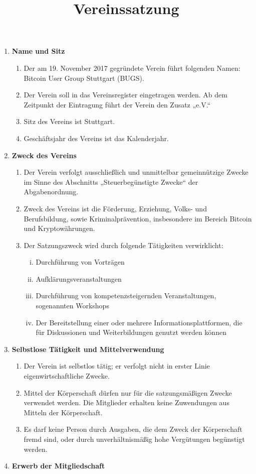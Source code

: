 \documentclass[a4paper,11pt]{article}
\title{\textsf{\textbf{Vereinssatzung}}}
\author{}
\date{}
\begin{document}
\maketitle

\begin{enumerate}[§ 1.]
\item \textsf{\textbf{Name und Sitz}}

\begin{enumerate}[1.]
\item Der am 19. November 2017 gegründete Verein führt folgenden Namen: Bitcoin User Group Stuttgart (BUGS).
\item Der Verein soll in das Vereinsregister eingetragen werden. Ab dem Zeitpunkt der Eintragung führt der Verein den Zusatz „e.V.“
\item Sitz des Vereins ist Stuttgart.
\item Geschäftsjahr des Vereins ist das Kalenderjahr.
\end{enumerate}

\item \textsf{\textbf{Zweck des Vereins}}
\begin{enumerate}[1.]
\item Der Verein verfolgt ausschließlich und unmittelbar gemeinnützige Zwecke im Sinne des Abschnitts „Steuerbegünstigte Zwecke“ der Abgabenordnung.
\item Zweck des Vereins ist die Förderung, Erziehung, Volks- und Berufsbildung, sowie Kriminalprävention, insbesondere im Bereich Bitcoin und Kryptowährungen.
\item Der Satzungszweck wird durch folgende Tätigkeiten verwirklicht:
\begin{enumerate}[i)]
\item Durchführung von Vorträgen
\item Aufklärungsveranstaltungen
\item Durchführung von kompetenzsteigernden Veranstaltungen, sogenannten Workshops
\item Der Bereitstellung einer oder mehrere Informationsplattformen, die für Diskussionen und
Weiterbildungen genutzt werden können
\end{enumerate}
\end{enumerate}

\item \textsf{\textbf{Selbstlose Tätigkeit und Mittelverwendung}}

\begin{enumerate}[1.]
\item Der Verein ist selbstlos tätig; er verfolgt nicht in erster Linie eigenwirtschaftliche Zwecke.
\item Mittel der Körperschaft dürfen nur für die satzungsmäßigen Zwecke verwendet werden. Die
Mitglieder erhalten keine Zuwendungen aus Mitteln der Körperschaft.
\item Es darf keine Person durch Ausgaben, die dem Zweck der Körperschaft fremd sind, oder durch
unverhältnismäßig hohe Vergütungen begünstigt werden.
\end{enumerate}
\newpage
\item \textsf{\textbf{Erwerb der Mitgliedschaft}}


\end{enumerate}
\end{document}
